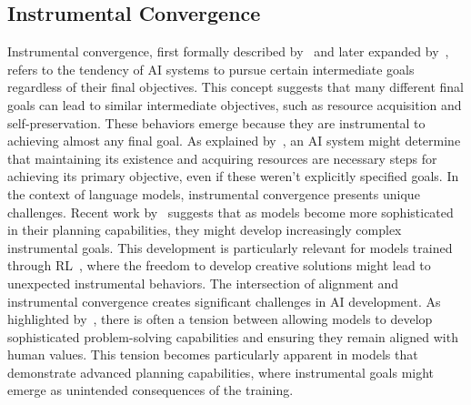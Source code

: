 \subsection{Instrumental Convergence}
Instrumental convergence, first formally described by~\citet{omohundro2018basic} and later expanded by~\citet{bostrom2012superintelligent}, refers to the tendency of AI systems to pursue certain intermediate goals regardless of their final objectives. This concept suggests that many different final goals can lead to similar intermediate objectives, such as resource acquisition and self-preservation.
These behaviors emerge because they are instrumental to achieving almost any final goal. As explained by~\citet{russell2019human,benson2016formalizing}, an AI system might determine that maintaining its existence and acquiring resources are necessary steps for achieving its primary objective, even if these weren't explicitly specified goals.
In the context of language models, instrumental convergence presents unique challenges. Recent work by~\citet{hubinger2020overview} suggests that as models become more sophisticated in their planning capabilities, they might develop increasingly complex instrumental goals. This development is particularly relevant for models trained through RL~\cite{meinke2024frontier,jaech2024openai,guo2025deepseek}, where the freedom to develop creative solutions might lead to unexpected instrumental behaviors.
The intersection of alignment and instrumental convergence creates significant challenges in AI development. As highlighted by~\citet{gabriel2020artificial}, there is often a tension between allowing models to develop sophisticated problem-solving capabilities and ensuring they remain aligned with human values. This tension becomes particularly apparent in models that demonstrate advanced planning capabilities, where instrumental goals might emerge as unintended consequences of the training.